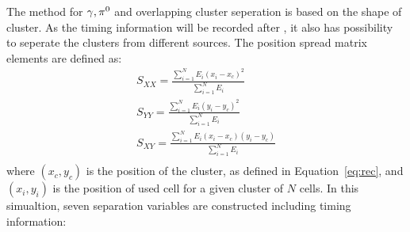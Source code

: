 The method for $\gamma, {{\pi}^0}$ and overlapping cluster seperation is based on the shape of cluster.
As the timing information will be recorded after \upgradetwo, 
it also has possibility to seperate the clusters from different sources.
The position spread matrix elements are defined as:
\begin{equation}
\label{eq:spread_matrix}
\begin{split}
   S_{XX} = \frac{\sum_{i=1}^{N}E_{i}(x_{i}-x_{c})^2}{\sum_{i=1}^{N}E_{i}} \\
   S_{YY} = \frac{\sum_{i=1}^{N}E_{i}(y_{i}-y_{c})^2}{\sum_{i=1}^{N}E_{i}} \\
   S_{XY} = \frac{\sum_{i=1}^{N}E_{i}(x_{i}-x_{c})(y_{i}-y_{c})}{\sum_{i=1}^{N}E_{i}} \\
\end{split}
\end{equation}
where $(x_c,y_c)$ is the position of the cluster, as defined in Equation~\ref{eq:rec},
and $(x_i,y_i)$ is the position of used cell for a given cluster of $N$ cells.
In this simualtion, 
seven separation variables are constructed including timing information:
